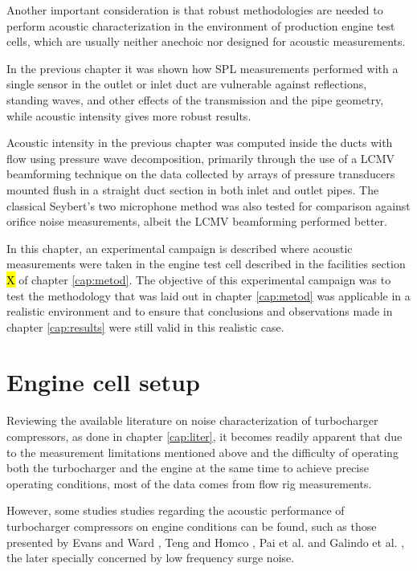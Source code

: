 Another important consideration is that robust methodologies are needed to perform acoustic characterization in the environment of production engine test cells, which are usually neither anechoic nor designed for acoustic measurements.

In the previous chapter it was shown how SPL measurements performed with a single sensor in the outlet or inlet duct are vulnerable against reflections, standing waves, and other effects of the transmission and the pipe geometry, while acoustic intensity gives more robust results.

Acoustic intensity in the previous chapter was computed inside the ducts with flow using pressure wave decomposition, primarily through the use of a LCMV beamforming technique on the data collected by arrays of pressure transducers mounted flush in a straight duct section in both inlet and outlet pipes. The classical Seybert's two microphone method \cite{seybert1988two} was also tested for comparison against orifice noise measurements, albeit the LCMV beamforming performed better.

In this chapter, an experimental campaign is described where acoustic measurements were taken in the engine test cell described in the facilities section \hl{X} of chapter \ref{cap:metod}. The objective of this experimental campaign was to test the methodology that was laid out in chapter \ref{cap:metod} was applicable in a realistic environment and to ensure that conclusions and observations made in chapter \ref{cap:results} were still valid in this realistic case.

\section{Engine cell setup}
\label{sec:experimental_characterization}

Reviewing the available literature on noise characterization of turbocharger compressors, as done in chapter \ref{cap:liter}, it becomes readily apparent that due to the measurement limitations mentioned above and the difficulty of operating both the turbocharger and the engine at the same time to achieve precise operating conditions, most of the data comes from flow rig measurements.

However, some studies studies regarding the acoustic performance of turbocharger compressors on engine conditions can be found, such as those presented by Evans and Ward \cite{evans2005minimizing,evans2006reduction}, Teng and Homco \cite{teng2009investigation},  Pai et al. \cite{pai2013air,pai2015turbocharger} and Galindo et al. \cite{galindo2013engine,galindo2011measurement,galindo2008experiments}, the later specially concerned by low frequency surge noise.

